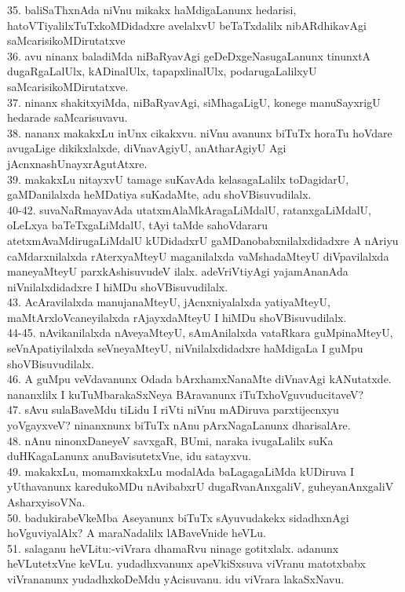 \documentclass{article}
\begin{document}
35. baliSaThxnAda niVnu mikakx haMdigaLanunx hedarisi, hatoVTiyalilxTuTxkoMDidadxre avelalxvU beTaTxdalilx nibARdhikavAgi saMcarisikoMDirutatxve\\
36. avu ninanx baladiMda niBaRyavAgi geDeDxgeNasugaLanunx tinunxtA dugaRgaLalUlx, kADinalUlx, tapapxlinalUlx, podarugaLalilxyU saMcarisikoMDirutatxve.\\
37. ninanx shakitxyiMda, niBaRyavAgi, siMhagaLigU, konege manuSayxrigU hedarade saMcarisuvavu.\\
38. nananx makakxLu inUnx cikakxvu. niVnu avanunx biTuTx horaTu hoVdare avugaLige dikikxlalxde, diVnavAgiyU, anAtharAgiyU Agi jAcnxnashUnayxrAgutAtxre.\\
39. makakxLu nitayxvU tamage suKavAda kelasagaLalilx toDagidarU, gaMDanilalxda heMDatiya suKadaMte, adu shoVBisuvudilalx.\\
40-42. suvaNaRmayavAda utatxmAlaMkAragaLiMdalU, ratanxgaLiMdalU, oLeLxya baTeTxgaLiMdalU, tAyi taMde sahoVdararu atetxmAvaMdirugaLiMdalU kUDidadxrU gaMDanobabxnilalxdidadxre A nAriyu caMdarxnilalxda rAterxyaMteyU maganilalxda vaMshadaMteyU diVpavilalxda maneyaMteyU parxkAshisuvudeV ilalx. adeVriVtiyAgi yajamAnanAda niVnilalxdidadxre I hiMDu shoVBisuvudilalx.\\
43. AcAravilalxda manujanaMteyU, jAcnxniyalalxda yatiyaMteyU, maMtArxloVcaneyilalxda rAjayxdaMteyU I hiMDu shoVBisuvudilalx.\\
44-45. nAvikanilalxda nAveyaMteyU, sAmAnilalxda vataRkara guMpinaMteyU, seVnApatiyilalxda seVneyaMteyU, niVnilalxdidadxre haMdigaLa I guMpu shoVBisuvudilalx.\\
46. A guMpu veVdavanunx Odada bArxhamxNanaMte diVnavAgi kANutatxde. nananxlilx I kuTuMbarakaSxNeya BAravanunx iTuTxhoVguvuducitaveV?\\
47. sAvu sulaBaveMdu tiLidu I riVti niVnu mADiruva parxtijecnxyu yoVgayxveV? ninanxnunx biTuTx nAnu pArxNagaLanunx dharisalAre.\\
48. nAnu ninonxDaneyeV savxgaR, BUmi, naraka ivugaLalilx suKa duHKagaLanunx anuBavisutetxVne, idu satayxvu.\\
49. makakxLu, momamxkakxLu modalAda baLagagaLiMda kUDiruva I yUthavanunx karedukoMDu nAvibabxrU dugaRvanAnxgaliV, guheyanAnxgaliV AsharxyisoVNa.\\
50. badukirabeVkeMba Aseyanunx biTuTx sAyuvudakekx sidadhxnAgi hoVguviyalAlx? A maraNadalilx lABaveVnide heVLu.\\
51. salaganu heVLitu:-viVrara dhamaRvu ninage gotitxlalx. adanunx heVLutetxVne keVLu. yudadhxvanunx apeVkiSxsuva viVranu matotxbabx viVrananunx yudadhxkoDeMdu yAcisuvanu. idu viVrara lakaSxNavu.\\
\end{document}
